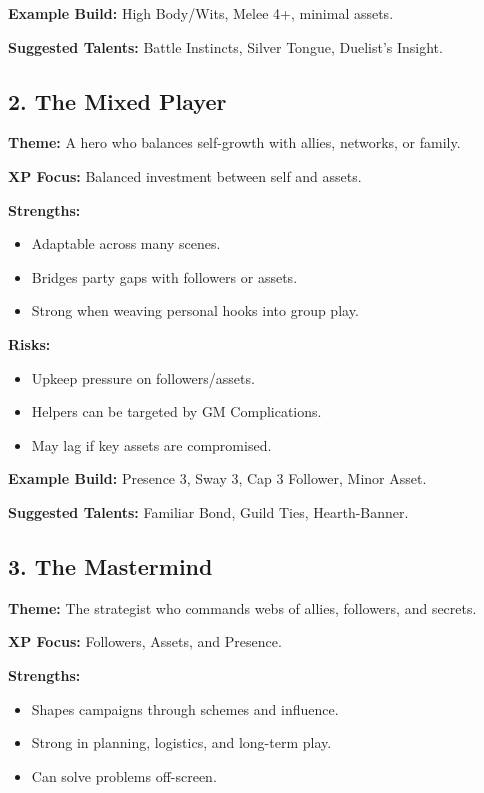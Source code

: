\textbf{Example Build:} High Body/Wits, Melee 4+, minimal assets.

\textbf{Suggested Talents:} Battle Instincts, Silver Tongue, Duelist’s Insight.

\subsection*{2. The Mixed Player}

\textbf{Theme:} A hero who balances self-growth with allies, networks, or family.

\textbf{XP Focus:} Balanced investment between self and assets.

\textbf{Strengths:}
\begin{itemize}
  \item Adaptable across many scenes.
  \item Bridges party gaps with followers or assets.
  \item Strong when weaving personal hooks into group play.
\end{itemize}

\textbf{Risks:}
\begin{itemize}
  \item Upkeep pressure on followers/assets.
  \item Helpers can be targeted by GM Complications.
  \item May lag if key assets are compromised.
\end{itemize}

\textbf{Example Build:} Presence 3, Sway 3, Cap 3 Follower, Minor Asset.

\textbf{Suggested Talents:} Familiar Bond, Guild Ties, Hearth-Banner.

\subsection*{3. The Mastermind}

\textbf{Theme:} The strategist who commands webs of allies, followers, and secrets.

\textbf{XP Focus:} Followers, Assets, and Presence.

\textbf{Strengths:}
\begin{itemize}
  \item Shapes campaigns through schemes and influence.
  \item Strong in planning, logistics, and long-term play.
  \item Can solve problems off-screen.
\end{itemize}

